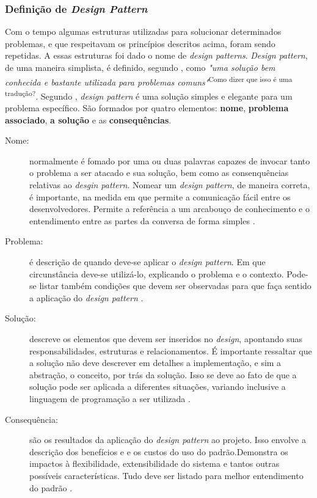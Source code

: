 \subsubsection{Definição de \textit{Design Pattern}} 
Com o tempo algumas estruturas utilizadas para solucionar determinados problemas, e que respeitavam os princípios descritos acima, foram sendo repetidas. A essas estruturas foi dado o nome de \textit{design patterns}. \textit{Design pattern}, de uma maneira simplista, é definido, segundo , como \textit{"uma solução bem conhecida e bastante utilizada para problemas comuns"}\textsuperscript{Como dizer que isso é uma tradução?}. Segundo , \textit{design pattern} é uma solução simples e elegante para um problema específico. São formados por quatro elementos: \textbf{nome}, \textbf{problema associado}, \textbf{a solução} e as \textbf{consequências}.
\begin{description}
\item[Nome:] normalmente é fomado por uma ou duas palavras capazes de invocar tanto o problema a ser atacado e sua solução, bem como as consenquências relativas ao \textit{desgin pattern}. Nomear um \textit{design pattern}, de maneira correta, é importante, na medida em que permite a comunicação fácil entre os desenvolvedores. Permite a referência a um arcabouço de conhecimento e o entendimento entre as partes da conversa de forma simples \cite{martin2000}.
\item[Problema:] é descrição de quando deve-se aplicar o \textit{design pattern}. Em que circunstância deve-se utilizá-lo, explicando o problema e o contexto. Pode-se listar também condições que devem ser observadas para que faça sentido a aplicação do \textit{design pattern} \cite{martin2000}.
\item[Solução:] descreve os elementos que devem ser inseridos no \textit{design}, apontando suas responsabilidades, estruturas e relacionamentos. É importante ressaltar que a solução não deve descrever em detalhes a implementação, e sim a abstração, o conceito, por trás da solução. Isso se deve ao fato de que a solução pode ser aplicada a diferentes situações, variando inclusive a linguagem de programação a ser utilizada \cite{martin2000}.
\item[Consequência:] são os resultados da aplicação do \textit{design pattern} ao projeto. Isso envolve a descrição dos benefícios e e os custos do uso do padrão.Demonstra os impactos à flexibilidade, extensibilidade do sistema e tantos outras possíveis características. Tudo deve ser listado para melhor entendimento do padrão \cite{martin2000}.
\end{description}
\par
